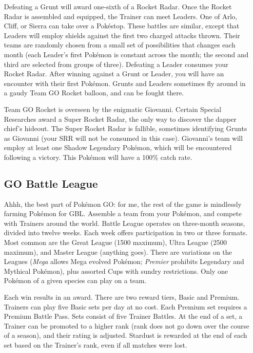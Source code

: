 Defeating a Grunt will award one-sixth of a Rocket Radar.
Once the Rocket Radar is assembled and equipped, the Trainer can meet Leaders.
One of Arlo, Cliff, or Sierra can take over a Pokéstop.
These battles are similar, except that Leaders will employ shields against the first two charged attacks thrown.
Their teams are randomly chosen from a small set of possibilities that changes each month
  (each Leader's first Pokémon is constant across the month; the second and third are selected
  from groups of three).
Defeating a Leader consumes your Rocket Radar.
After winning against a Grunt or Leader, you will have an encounter with their first Pokémon.
Grunts and Leaders sometimes fly around in a gaudy Team GO Rocket balloon,
  and can be fought there.

Team GO Rocket is overseen by the enigmatic Giovanni.
Certain Special Researches award a Super Rocket Radar, the only way to discover
 the dapper chief's hideout.
The Super Rocket Radar is fallible, sometimes identifying Grunts as Giovanni
 (your SRR will not be consumed in this case).
Giovanni's team will employ at least one Shadow Legendary Pokémon, which
 will be encountered following a victory.
This Pokémon will have a 100\% catch rate.

\subsection{GO Battle League\label{subsec:league}}
Ahhh, the best part of Pokémon GO: for me, the rest of the game is mindlessly farming Pokémon for GBL.
Assemble a team from your Pokémon, and compete with Trainers around the world.
Battle League operates on three-month seasons, divided into twelve weeks.
Each week offers participation in two or three formats.
Most common are the Great League (1500 \CP{} maximum), Ultra League (2500 \CP{} maximum),
 and Master League (anything goes).
There are variations on the Leagues (\textit{Mega} allows Mega evolved Pokémon;
 \textit{Premier} prohibits Legendary and Mythical Pokémon),
 plus assorted Cups with sundry restrictions.
Only one Pokémon of a given species can play on a team.

Each win results in an award.
There are two reward tiers, Basic and Premium.
Trainers can play five Basic sets per day at no cost.
Each Premium set requires a Premium Battle Pass.
Sets consist of five Trainer Battles.
At the end of a set, a Trainer can be promoted to a higher rank (rank does not
 go down over the course of a season), and their rating is adjusted.
Stardust is rewarded at the end of each set based on the Trainer's rank,
 even if all matches were lost.

